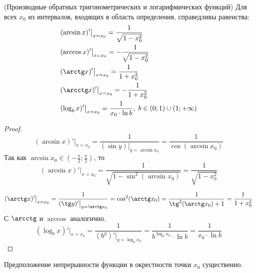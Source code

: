 \begin{corollary} (Производные обратных тригонометрических и логарифмических функций)
	Для всех $x_0$ из интервалов, входящих в область определения, справедливы равенства:
	\begin{align*}
		&(\arcsin x)' \big|_{x = x_0} = \frac{1}{\sqrt{1 - x_0^2}}
		\\
		&(\arccos x)' \big|_{x = x_0} = -\frac{1}{\sqrt{1 - x_0^2}}
		\\
		&(\arctg x)' \big|_{x = x_0} = \frac{1}{1 + x_0^2}
		\\
		&(\arcctg x)' \big|_{x = x_0} = -\frac{1}{1 + x_0^2}
		\\
		&(\log_b x)' \big|_{x = x_0} = \frac{1}{x_0 \cdot \ln b},\ b \in (0; 1) \cup (1; +\infty)
	\end{align*}
\end{corollary}

\begin{proof}
	\[
	(\arcsin x)' \big|_{x = x_0} = \frac{1}{(\sin y) \big|_{y = \arcsin x_0}} = \frac{1}{\cos(\arcsin x_0)}
	\]
	Так как $\arcsin x_0 \in (-\frac{\pi}{2}; \frac{\pi}{2})$, то
	\[
	(\arcsin x)' \big|_{x = x_0} = \frac{1}{\sqrt{1 - \sin^2(\arcsin x_0)}} = \frac{1}{\sqrt{1 - x_0^2}}
	\]
	
	\[
	(\arctg x)' \big|_{x = x_0} = \frac{1}{(\tg y)' \big|_{y = \arctg x_0}} = \cos^2 (\arctg x_0) = \frac{1}{\tg^2 (\arctg x_0) + 1} = \frac{1}{1 + x_0^2}
	\]
	С $\arcctg$ и $\arccos$ аналогично.
	\[
	(\log_b x)' \big|_{x = x_0} = \frac{1}{(b^y)' \big|_{y = \log_b x_0}} = \frac{1}{b^{\log_b x_0} \cdot \ln b} = \frac{1}{x_0 \cdot \ln b}
	\]
\end{proof}

\begin{note}
	Предположение непрерывности функции в окрестности точки $x_0$ существенно.
\end{note}

